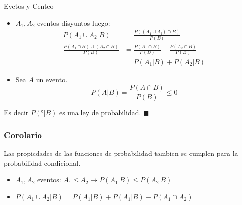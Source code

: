 \documentclass[a4paper]{book}
\begin{document}
\begin{chapter}{Evetos y Conteo}
\begin{itemize}
        \item $A_1,A_2$ eventos disyuntos luego:
            \begin{equation*}
            \begin{split}
                P\left(A_1\cup A_2|B\right) & = \frac{P\left(\left(A_1\cup
                A_2\right)\cap B\right)}{P\left(B\right)}\\
                \frac{P\left(A_1\cap B\right)\cup\left(A_2\cap B\right)}{P\left(B\right)} & = \frac{P\left(A_1\cap B\right)}{P\left(B\right)} + \frac{P\left(A_2\cap B\right)}{P\left(B\right)}\\
                & = P\left(A_1|B\right)+P\left(A_2|B\right)
            \end{split}
            \end{equation*}
        \item Sea $A$ un evento.
            \begin{equation*}
               P\left(A|B\right) = \frac{P\left(A\cap B\right)}{P\left(B\right)}\leq 0
            \end{equation*}
    \end{itemize}

    Es decir $P\left(°|B\right)$ es una ley de probabilidad. $\blacksquare$


    \subsubsection{Corolario}
    \label{ssec:corolario}

    Las propiedades de las funciones de probabilidad tambien se cumplen para la
    probabilidad condicional.

    \begin{ej}
        \begin{itemize}
            \item $A_1,A_2$ eventos: $A_1\leq A_2\to P\left(A_1|B\right)\leq
                P\left(A_2|B\right)$

            \item $P\left(A_1\cup A_2|B\right) = P\left(A_1|B\right) +
                P\left(A_1|B\right) - P\left(A_1\cap A_2\right)$
        \end{itemize}


\end{ej}
\end{chapter}
\end{document}

